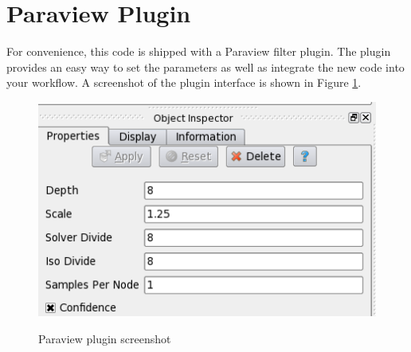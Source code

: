 \documentclass{InsightArticle}
\begin{document}
\pagebreak
\section{Paraview Plugin}
For convenience, this code is shipped with a Paraview filter plugin. The plugin provides an easy way to set the parameters as well as integrate the new code into your workflow. A screenshot of the plugin interface is shown in Figure \ref{fig:Plugin}.

\begin{figure}[H]
\centering
\includegraphics[width=0.3\linewidth]{Images/Plugin}
\label{fig:Plugin}
\caption{Paraview plugin screenshot}
\end{figure}



\end{document}
